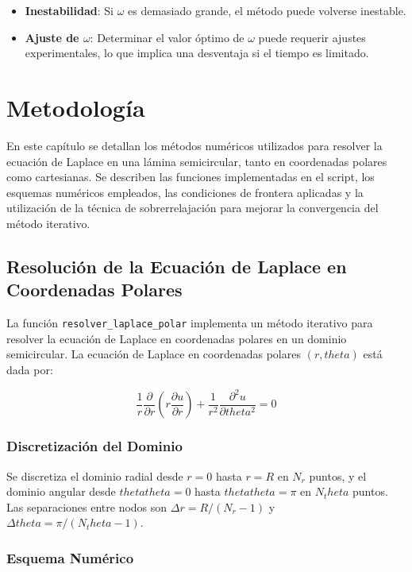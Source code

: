 \begin{itemize}
    \item \textbf{Inestabilidad}: Si \( \omega \) es demasiado grande, el método puede volverse inestable.
    \item \textbf{Ajuste de \( \omega \)}: Determinar el valor óptimo de \( \omega \) puede requerir ajustes experimentales, lo que implica una desventaja si el tiempo es limitado.
\end{itemize}


\chapter{Metodología}

En este capítulo se detallan los métodos numéricos utilizados para resolver la ecuación de Laplace en una lámina semicircular, tanto en coordenadas polares como cartesianas. Se describen las funciones implementadas en el script, los esquemas numéricos empleados, las condiciones de frontera aplicadas y la utilización de la técnica de sobrerrelajación para mejorar la convergencia del método iterativo.

\section{Resolución de la Ecuación de Laplace en Coordenadas Polares}

La función \texttt{resolver\_laplace\_polar} implementa un método iterativo para resolver la ecuación de Laplace en coordenadas polares en un dominio semicircular. La ecuación de Laplace en coordenadas polares $(r, theta)$ está dada por:

\begin{equation} \frac{1}{r} \frac{\partial}{\partial r} \left( r \frac{\partial u}{\partial r} \right) + \frac{1}{r^2} \frac{\partial^2 u}{\partial theta^2} = 0 \end{equation}

\subsection{Discretización del Dominio}

Se discretiza el dominio radial desde $r = 0$ hasta $r = R$ en $N_r$ puntos, y el dominio angular desde $thetatheta = 0$ hasta $thetatheta = \pi$ en $N_theta$ puntos. Las separaciones entre nodos son $\Delta r = R / (N_r - 1)$ y $\Delta theta = \pi / (N_theta - 1)$.

\subsection{Esquema Numérico}

